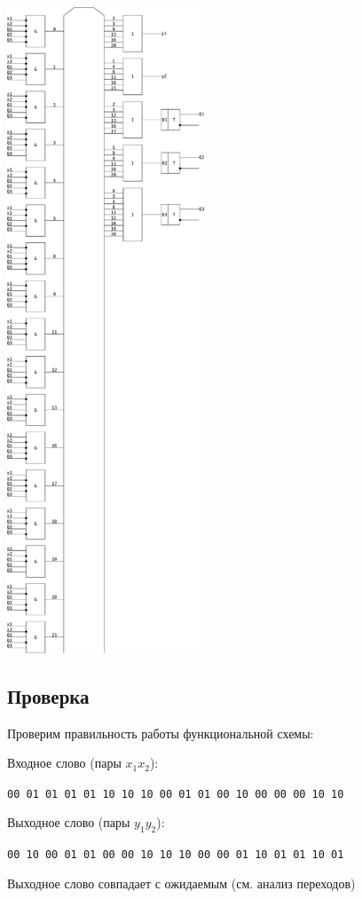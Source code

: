 \documentclass[listings]{labreport}
\begin{document}
\newpage
{}
\thispagestyle{empty}
\includegraphics[width=0.44\textwidth]{sdffcircuit.pdf}
\restoregeometry

\subsection*{Проверка}

Проверим правильность работы функциональной схемы:

Входное слово (пары $x_1x_2$):

\verb|00 01 01 01 01 10 10 10 00 01 01 00 10 00 00 00 10 10|

Выходное слово (пары $y_1y_2$):

\verb|00 10 00 01 01 00 00 10 10 10 00 00 01 10 01 01 10 01|

Выходное слово совпадает с ожидаемым (см. анализ переходов)
\end{document}
